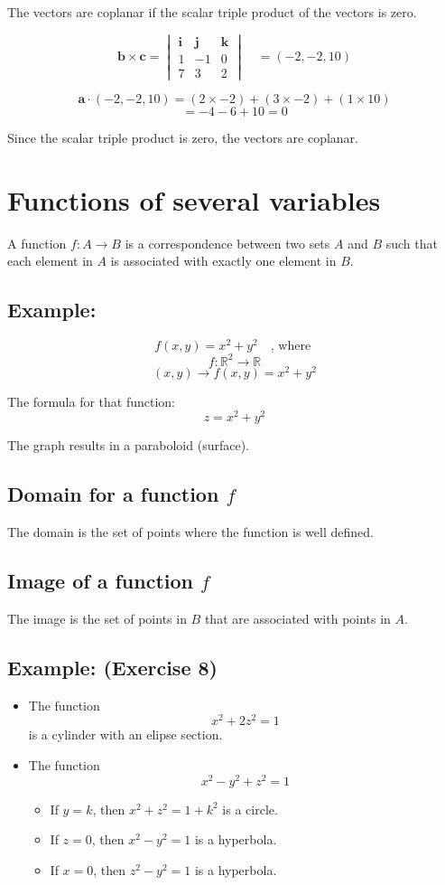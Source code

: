 \documentclass[11pt]{article}
\begin{document}
The vectors are coplanar if the scalar triple product of the vectors is zero.

\[
\mathbf{b} \times \mathbf{c} =
\begin{vmatrix}
\mathbf{i} & \mathbf{j} & \mathbf{k} \\
1 & -1 & 0 \\
7 & 3 & 2
\end{vmatrix}
\quad 
= (-2, -2, 10)
\]

\[
\mathbf{a} \cdot (-2, -2, 10) = (2 \times -2) + (3 \times -2) + (1 \times 10)
\]
\[
= -4 - 6 + 10 = 0
\]

Since the scalar triple product is zero, the vectors are coplanar.

\section{Functions of several variables}
A function $f : A \rightarrow B$ is a correspondence between two sets $A$ and $B$ such that each element in $A$ is associated with exactly one element in $B$.

\subsection*{Example:}
\[
f(x,y) = x^2 + y^2 \quad \text{, where }
\]
\[
f : \mathbb{R}^2 \rightarrow \mathbb{R}
\]
\[
(x,y) \rightarrow f(x,y) = x^2 + y^2
\]

The formula for that function:
\[
z = x^2 + y^2
\]

The graph results in a paraboloid (surface).

\subsection{Domain for a function $f$}
The domain is the set of points where the function is well defined.

\subsection{Image of a function $f$}
The image is the set of points in $B$ that are associated with points in $A$.

\subsection*{Example: (Exercise 8)}
\begin{itemize}
    \item The function \[ x^2 + 2z^2 = 1 \] is a cylinder with an elipse section.
    \item The function \[ x^2 - y^2 + z^2 = 1 \]
    \begin{itemize}
        \item If $y = k$, then $x^2 + z^2 = 1 + k^2$ is a circle.
        \item If $z = 0$, then $x^2 - y^2 = 1$ is a hyperbola.
        \item If $x = 0$, then $z^2 - y^2 = 1$ is a hyperbola.
    \end{itemize}
\end{itemize}
\end{document}
